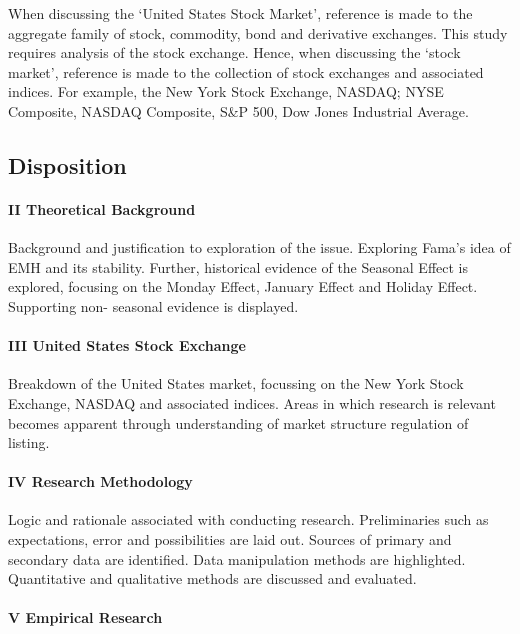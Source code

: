 \documentclass[11pt, english]{article}
\begin{document}
		When discussing the `United States Stock Market', reference is made to the aggregate family of stock, commodity, bond and derivative exchanges. This study requires analysis of the stock exchange. Hence, when discussing the `stock market', reference is made to the collection of stock exchanges and associated indices. For example, the New York Stock Exchange, NASDAQ; NYSE Composite, NASDAQ Composite, S\&P 500, Dow Jones Industrial Average.

	\newpage

	\subsection{Disposition}

		\paragraph*{II Theoretical Background}

		Background and justification to exploration of the issue. Exploring Fama’s idea of EMH and its stability. Further, historical evidence of the Seasonal Effect is explored, focusing on the Monday Effect, January Effect and Holiday Effect. Supporting non- seasonal evidence is displayed.

		\paragraph*{III United States Stock Exchange}
	
		Breakdown of the United States market, focussing on the New York Stock Exchange, NASDAQ and associated indices. Areas in which research is relevant becomes apparent through understanding of market structure regulation of listing.
	
		\paragraph*{IV Research Methodology}

		Logic and rationale associated with conducting research. Preliminaries such as expectations, error and possibilities are laid out. Sources of primary and secondary data are identified. Data manipulation methods are highlighted. Quantitative and qualitative methods are discussed and evaluated.

		\paragraph*{V Empirical Research}
\end{document}
